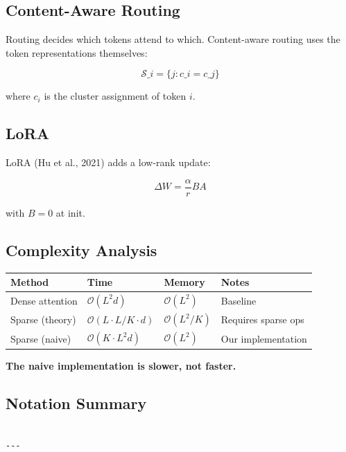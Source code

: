 \subsection{Content-Aware Routing}

Routing decides which tokens attend to which. Content-aware routing uses 
the token representations themselves:

\[
\mathcal{S}\_i = \{j : c\_i = c\_j\}
\tag{3.5}
\]

where $c_i$ is the cluster assignment of token $i$.

\subsection{LoRA}

LoRA (Hu et al., 2021) adds a low-rank update:

\[
\Delta W = \frac{\alpha}{r} B A
\tag{3.6}
\]

with $B = 0$ at init.

\subsection{Complexity Analysis}

\begin{table}[H]
\centering
\small
\begin{tabular}{llll}
\toprule
\textbf{Method} & \textbf{Time} & \textbf{Memory} & \textbf{Notes} \\
\midrule
Dense attention & $\mathcal{O}(L^2 d)$ & $\mathcal{O}(L^2)$ & Baseline \\
Sparse (theory) & $\mathcal{O}(L \cdot L/K \cdot d)$ & $\mathcal{O}(L^2/K)$ & Requires sparse ops \\
Sparse (naive) & $\mathcal{O}(K \cdot L^2 d)$ & $\mathcal{O}(L^2)$ & Our implementation \\
\bottomrule
\end{tabular}
\end{table}

\textbf{The naive implementation is slower, not faster.}

\subsection{Notation Summary}

\begin{lstlisting}

---
\end{lstlisting}